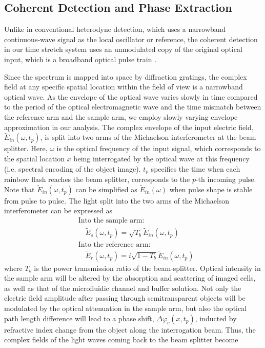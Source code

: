 \documentclass[aps,pra,reprint,longbibliography,superscriptaddress]{revtex4-1}
\begin{document}
\subsection{Coherent Detection and Phase Extraction}

Unlike in conventional heterodyne detection, which uses a narrowband continuous-wave signal as the local oscillator or reference, the coherent detection in our time stretch system uses an unmodulated copy of the original optical input, which is a broadband optical pulse train \cite{buckley2013coherent, devore2014coherent}. 

Since the spectrum is mapped into space by diffraction gratings, the complex field at any specific spatial location within the field of view is a narrowband optical wave. As the envelope of the optical wave varies slowly in time compared to the period of the optical electromagnetic wave and the time mismatch between the reference arm and the sample arm, we employ slowly varying envelope approximation in our analysis. The complex envelope of the input electric field, $\tilde{E}_{in}(\omega, t_p)$, is split into two arms of the Michaelson interferometer at the beam splitter. Here, $\omega$ is the optical frequency of the input signal, which corresponds to the spatial location $x$ being interrogated by the optical wave at this frequency (i.e. spectral encoding of the object image). $t_p$ specifies the time when each rainbow flash reaches the beam splitter, corresponds to the $p$-th incoming pulse. Note that $\tilde{E}_{in}(\omega,t_p)$ can be simplified as $\tilde{E}_{in}(\omega)$ when pulse shape is stable from pulse to pulse. The light split into the two arms of the Michaelson interferometer can be expressed as
\begin{equation}
\begin{split}
&\text{Into the sample arm:} \\
&\quad \tilde{E}_s(\omega, t_p) = \sqrt{T_b} \tilde{E}_{in}(\omega, t_p)  \\
&\text{Into the reference arm:} \\
&\quad \tilde{E}_r(\omega, t_p) = i \sqrt{1-T_b} \tilde{E}_{in}(\omega, t_p)
\end{split}
\end{equation}
where $T_b$ is the power transmission ratio of the beam-splitter. Optical intensity in the sample arm will be altered by the absorption and scattering of imaged cells, as well as that of the microfluidic channel and buffer solution. Not only the electric field amplitude after passing through semitransparent objects will be modulated by the optical attenuation in the sample arm, but also the optical path length difference will lead to a phase shift, $\Delta\varphi_c(x,t_p)$, inducted by refractive index change from the object along the interrogation beam. Thus, the complex fields of the light waves coming back to the beam splitter become
\end{document}
